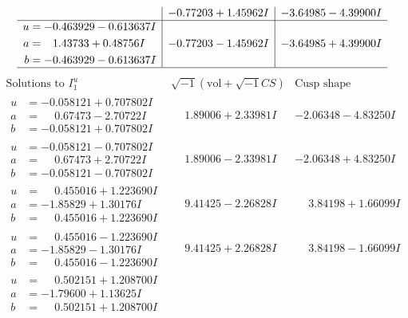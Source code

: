 \documentclass[1p]{elsarticle_modified}
\theoremstyle{definition}
\newcommand{\I}{\sqrt{-1}}
\begin{document}
$$\begin{array}{c|c|c}
 & -0.77203 + 1.45962 I & -3.64985 - 4.39900 I \\ \hline\begin{aligned}
u &= -0.463929 - 0.613637 I \\
a &= \phantom{-}1.43733 + 0.48756 I \\
b &= -0.463929 - 0.613637 I\end{aligned}
 & -0.77203 - 1.45962 I & -3.64985 + 4.39900 I\\
 \hline 
 \end{array}$$\newpage$$\begin{array}{c|c|c}  
\text{Solutions to }I^u_{1}& \I (\text{vol} + \sqrt{-1}CS) & \text{Cusp shape}\\
 \hline 
\begin{aligned}
u &= -0.058121 + 0.707802 I \\
a &= \phantom{-}0.67473 - 2.70722 I \\
b &= -0.058121 + 0.707802 I\end{aligned}
 & \phantom{-}1.89006 + 2.33981 I & -2.06348 - 4.83250 I \\ \hline\begin{aligned}
u &= -0.058121 - 0.707802 I \\
a &= \phantom{-}0.67473 + 2.70722 I \\
b &= -0.058121 - 0.707802 I\end{aligned}
 & \phantom{-}1.89006 - 2.33981 I & -2.06348 + 4.83250 I \\ \hline\begin{aligned}
u &= \phantom{-}0.455016 + 1.223690 I \\
a &= -1.85829 + 1.30176 I \\
b &= \phantom{-}0.455016 + 1.223690 I\end{aligned}
 & \phantom{-}9.41425 - 2.26828 I & \phantom{-}3.84198 + 1.66099 I \\ \hline\begin{aligned}
u &= \phantom{-}0.455016 - 1.223690 I \\
a &= -1.85829 - 1.30176 I \\
b &= \phantom{-}0.455016 - 1.223690 I\end{aligned}
 & \phantom{-}9.41425 + 2.26828 I & \phantom{-}3.84198 - 1.66099 I \\ \hline\begin{aligned}
u &= \phantom{-}0.502151 + 1.208700 I \\
a &= -1.79600 + 1.13625 I \\
b &= \phantom{-}0.502151 + 1.208700 I\end{aligned}

\end{array}$$
\end{document}
